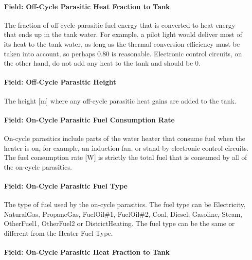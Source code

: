 \paragraph{Field: Off-Cycle Parasitic Heat Fraction to Tank}\label{field-off-cycle-parasitic-heat-fraction-to-tank-1}

The fraction of off-cycle parasitic fuel energy that is converted to heat energy that ends up in the tank water. For example, a pilot light would deliver most of its heat to the tank water, as long as the thermal conversion efficiency must be taken into account, so perhaps 0.80 is reasonable. Electronic control circuits, on the other hand, do not add any heat to the tank and should be 0.

\paragraph{Field: Off-Cycle Parasitic Height}\label{field-off-cycle-parasitic-height}

The height {[}m{]} where any off-cycle parasitic heat gains are added to the tank.

\paragraph{Field: On-Cycle Parasitic Fuel Consumption Rate}\label{field-on-cycle-parasitic-fuel-consumption-rate-1}

On-cycle parasitics include parts of the water heater that consume fuel when the heater is on, for example, an induction fan, or stand-by electronic control circuits. The fuel consumption rate {[}W{]} is strictly the total fuel that is consumed by all of the on-cycle parasitics.

\paragraph{Field: On-Cycle Parasitic Fuel Type}\label{field-on-cycle-parasitic-fuel-type-1}

The type of fuel used by the on-cycle parasitics. The fuel type can be Electricity, NaturalGas, PropaneGas, FuelOil\#1, FuelOil\#2, Coal, Diesel, Gasoline, Steam, OtherFuel1, OtherFuel2 or DistrictHeating. The fuel type can be the same or different from the Heater Fuel Type.

\paragraph{Field: On-Cycle Parasitic Heat Fraction to Tank}\label{field-on-cycle-parasitic-heat-fraction-to-tank-1}


